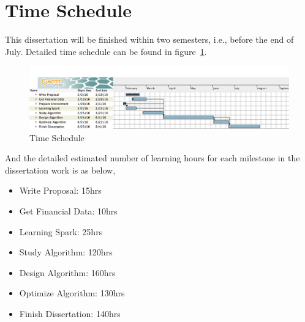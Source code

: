 \documentclass[12pt,a4paper]{scrartcl}
\begin{document}
	\section{Time Schedule}
	This dissertation will be finished within two semesters, i.e., before the end of July. Detailed time schedule can be found in figure~\ref{fig:sche}.
	\begin{figure}[h]
		\centering
		\includegraphics[width=\textwidth]{Schedule.png}
		\caption{Time Schedule}
		\label{fig:sche}
	\end{figure}
	And the detailed estimated number of learning hours for each milestone in the dissertation work is as below,
	\begin{itemize}
		\item Write Proposal: 15hrs
		\item Get Financial Data: 10hrs
		\item Learning Spark: 25hrs
		\item Study Algorithm: 120hrs
		\item Design Algorithm: 160hrs
		\item Optimize Algorithm: 130hrs
		\item Finish Dissertation: 140hrs
	\end{itemize}

	
\end{document}

